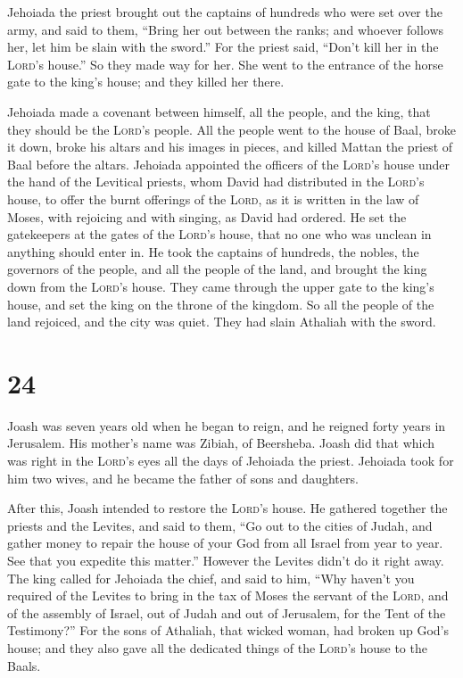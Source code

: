  Jehoiada the priest brought out the captains of hundreds
who were set over the army, and said to them, ``Bring her out between
the ranks; and whoever follows her, let him be slain with the sword.''
For the priest said, ``Don't kill her in the \textsc{Lord}'s house.''
 So they made way for her. She went to the entrance of
the horse gate to the king's house; and they killed her there.

 Jehoiada made a covenant between himself, all the
people, and the king, that they should be the \textsc{Lord}'s people.
 All the people went to the house of Baal, broke it down,
broke his altars and his images in pieces, and killed Mattan the priest
of Baal before the altars.  Jehoiada appointed the
officers of the \textsc{Lord}'s house under the hand of the Levitical
priests, whom David had distributed in the \textsc{Lord}'s house, to
offer the burnt offerings of the \textsc{Lord}, as it is written in the
law of Moses, with rejoicing and with singing, as David had ordered.
 He set the gatekeepers at the gates of the
\textsc{Lord}'s house, that no one who was unclean in anything should
enter in.  He took the captains of hundreds, the nobles,
the governors of the people, and all the people of the land, and brought
the king down from the \textsc{Lord}'s house. They came through the
upper gate to the king's house, and set the king on the throne of the
kingdom.  So all the people of the land rejoiced, and the
city was quiet. They had slain Athaliah with the sword.

\hypertarget{section-23}{%
\section{24}\label{section-23}}

 Joash was seven years old when he began to reign, and he
reigned forty years in Jerusalem. His mother's name was Zibiah, of
Beersheba.  Joash did that which was right in the
\textsc{Lord}'s eyes all the days of Jehoiada the priest. 
Jehoiada took for him two wives, and he became the father of sons and
daughters.

 After this, Joash intended to restore the \textsc{Lord}'s
house.  He gathered together the priests and the Levites,
and said to them, ``Go out to the cities of Judah, and gather money to
repair the house of your God from all Israel from year to year. See that
you expedite this matter.'' However the Levites didn't do it right away.
 The king called for Jehoiada the chief, and said to him,
``Why haven't you required of the Levites to bring in the tax of Moses
the servant of the \textsc{Lord}, and of the assembly of Israel, out of
Judah and out of Jerusalem, for the Tent of the Testimony?''
 For the sons of Athaliah, that wicked woman, had broken
up God's house; and they also gave all the dedicated things of the
\textsc{Lord}'s house to the Baals.

